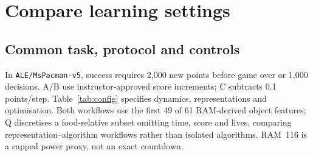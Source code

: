 \setcounter{section}{1}
\section{Compare learning settings}
\label{sec:learning-settings}

\subsection{Common task, protocol and controls}
In \texttt{ALE/MsPacman-v5}, success requires 2,000 new points before game over or
1,000 decisions. A/B use instructor-approved score increments; C subtracts 0.1 points/step.
Table~\ref{tab:config} specifies dynamics, representations and optimisation. Both
workflows use the first 49 of 61 RAM-derived object features; Q discretises a food-relative
subset omitting time, score and lives, comparing representation--algorithm workflows
rather than isolated algorithms. RAM~116 is a capped power proxy, not an exact countdown.

